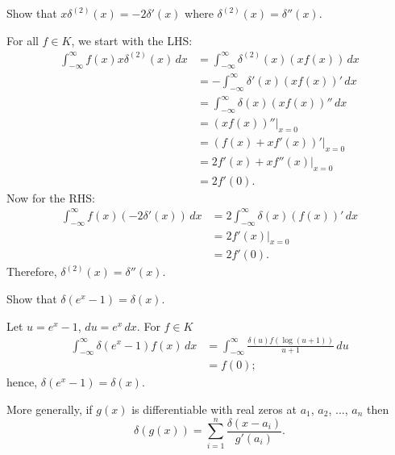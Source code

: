 
\begin{example}
    Show that $x \delta^{(2)}(x) = -2\delta'(x)$
    where $\delta^{(2)}(x) = \delta''(x)$.
\end{example}

\begin{solution}
    For all $f \in K$, we start with the LHS:
    \begin{align*}
        \int_{-\infty}^{\infty} f(x) x \delta^{(2)}(x) \,dx
        &= \int_{-\infty}^{\infty} \delta^{(2)}(x) (xf(x)) \,dx \\
        &= -\int_{-\infty}^{\infty} \delta'(x) (xf(x))' \,dx \\
        &= \int_{-\infty}^{\infty} \delta(x) (xf(x))'' \,dx \\
        &= (xf(x))'' \rvert_{x=0} \\
        &= (f(x) + xf'(x))' \rvert_{x=0} \\
        &= 2f'(x) + xf''(x) \rvert_{x=0} \\
        &= 2f'(0).
    \end{align*}
    Now for the RHS:
    \begin{align*}
        \int_{-\infty}^{\infty} f(x) (-2\delta'(x)) \,dx
        &= 2\int_{-\infty}^{\infty} \delta(x) (f(x))' \,dx \\
        &= 2f'(x) \rvert_{x=0} \\
        &= 2f'(0).
    \end{align*}
    Therefore, $\delta^{(2)}(x) = \delta''(x)$.
\end{solution}

\begin{example}
    Show that $\delta(e^x - 1) = \delta(x)$.
\end{example}

\begin{solution}
    Let $u = e^x - 1$, $du = e^x \,dx$.
    For $f \in K$
    \begin{align*}
        \int_{-\infty}^{\infty} \delta(e^x - 1) f(x) \,dx
        &= \int_{-\infty}^{\infty} \frac{\delta(u) f(\log(u+1))}{u+1} \,du \\
        &= f(0);
    \end{align*}
    hence, $\delta(e^x-1) = \delta(x)$.
\end{solution}

\begin{remark}
    More generally, if $g(x)$ is differentiable
    with real zeros at $a_1$, $a_2$, $\ldots$, $a_n$
    then
    \[
        \delta(g(x)) = \sum^{n}_{i=1} \frac{\delta(x-a_i)}{g'(a_i)}.
    \]
\end{remark}

